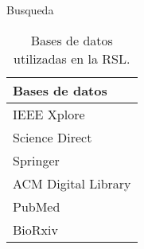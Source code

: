 \documentclass[10pt]{beamer}
\newcommand{\1}{
	\setbeamertemplate{background}{
		\texttt{[image: img/1]}
		\tikz[overlay] \fill[fill opacity=0.75,fill=white] (0,0) rectangle (-\paperwidth,\paperheight);
	}
}
\begin{document}
\begin{frame}{Busqueda}{}
	
	\begin{table}[H]
		\centering
		\begin{center}
			\caption{Bases de datos utilizadas en la RSL.}
			\label{tab:bd_RSL}
			\setlength{\tabcolsep}{0.5em} %
			{\renewcommand{\arraystretch}{1.2}%
				\begin{tabular}{p{3cm}}
					\textbf{Bases de datos} \\ \hline
					IEEE Xplore                                                                               \\
					Science Direct \\				
					Springer          \\
					ACM Digital Library                                                                                                             \\	
					PubMed \\ 
					BioRxiv \\ 	
				\end{tabular}
			}
		\end{center}
	\end{table}
	
\end{frame}
\end{document}
